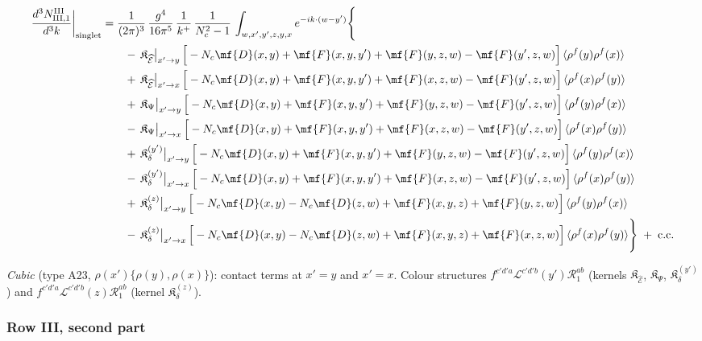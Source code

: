 \begin{align}
\frac{d^{3}N^{\rm III}_{{\rm III},1}}{d^{3}k}\bigg|_{\rm singlet}&=\frac{1}{(2\pi)^{3}}\,\frac{g^{4}}{16\pi^{5}}\,\frac{1}{k^{+}}\,\frac{1}{N_{c}^{2}-1}\,\int_{w,x',y',z,y,x}e^{-ik\cdot(w-y')}\Bigg\{\notag\\
&\qquad -\,\mathfrak{K}_{\widehat{\mathcal{E}}}\big|_{x'\to y}\,\Big[-N_{c}\mf{D}(x,y)+\mf{F}(x,y,y')+\mf{F}(y,z,w)-\mf{F}(y',z,w)\Big]\,\langle\rho^{f}(y)\rho^{f}(x)\rangle\notag\\
&\qquad +\,\mathfrak{K}_{\widehat{\mathcal{E}}}\big|_{x'\to x}\,\Big[-N_{c}\mf{D}(x,y)+\mf{F}(x,y,y')+\mf{F}(x,z,w)-\mf{F}(y',z,w)\Big]\,\langle\rho^{f}(x)\rho^{f}(y)\rangle\notag\\
&\qquad +\,\mathfrak{K}_{\Psi}\big|_{x'\to y}\,\Big[-N_{c}\mf{D}(x,y)+\mf{F}(x,y,y')+\mf{F}(y,z,w)-\mf{F}(y',z,w)\Big]\,\langle\rho^{f}(y)\rho^{f}(x)\rangle\notag\\
&\qquad -\,\mathfrak{K}_{\Psi}\big|_{x'\to x}\,\Big[-N_{c}\mf{D}(x,y)+\mf{F}(x,y,y')+\mf{F}(x,z,w)-\mf{F}(y',z,w)\Big]\,\langle\rho^{f}(x)\rho^{f}(y)\rangle\notag\\
&\qquad +\,\mathfrak{K}_{\delta}^{(y')}\big|_{x'\to y}\,\Big[-N_{c}\mf{D}(x,y)+\mf{F}(x,y,y')+\mf{F}(y,z,w)-\mf{F}(y',z,w)\Big]\,\langle\rho^{f}(y)\rho^{f}(x)\rangle\notag\\
&\qquad -\,\mathfrak{K}_{\delta}^{(y')}\big|_{x'\to x}\,\Big[-N_{c}\mf{D}(x,y)+\mf{F}(x,y,y')+\mf{F}(x,z,w)-\mf{F}(y',z,w)\Big]\,\langle\rho^{f}(x)\rho^{f}(y)\rangle\notag\\
&\qquad +\,\mathfrak{K}_{\delta}^{(z)}\big|_{x'\to y}\,\Big[-N_{c}\mf{D}(x,y)-N_{c}\mf{D}(z,w)+\mf{F}(x,y,z)+\mf{F}(y,z,w)\Big]\,\langle\rho^{f}(y)\rho^{f}(x)\rangle\notag\\
&\qquad -\,\mathfrak{K}_{\delta}^{(z)}\big|_{x'\to x}\,\Big[-N_{c}\mf{D}(x,y)-N_{c}\mf{D}(z,w)+\mf{F}(x,y,z)+\mf{F}(x,z,w)\Big]\,\langle\rho^{f}(x)\rho^{f}(y)\rangle\Bigg\}\;+\;{\rm c.c.}\label{eq:s-III-III-1}
\end{align}

\emph{Cubic} (type A23, $\rho(x')\{\rho(y),\rho(x)\}$): contact terms at $x'=y$ and $x'=x$. Colour structures $f^{c'd'a}\mathcal{L}^{c'd'b}(y')\mathcal{R}^{ab}_{1}$ (kernels $\mathfrak{K}_{\widehat{\mathcal{E}}}$, $\mathfrak{K}_{\Psi}$, $\mathfrak{K}_{\delta}^{(y')}$) and $f^{c'd'a}\mathcal{L}^{c'd'b}(z)\mathcal{R}^{ab}_{1}$ (kernel $\mathfrak{K}_{\delta}^{(z)}$).
\subsubsection*{Row III, second part}

